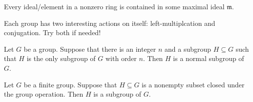 \documentclass[openany]{book}
\begin{document}
\begin{prop}
    Every ideal/element in a nonzero ring is contained in some maximal ideal $\mathfrak{m}$.
\end{prop}

\begin{prop}
    Each group has two interesting actions on itself: left-multiplcation and conjugation. Try both if needed!
\end{prop}

\begin{prop}
    Let $G$ be a group. Suppose that there is an integer $n$ and a subgroup $H\subseteq G$ such that $H$ is the only subgroup of $G$ with order $n$. Then $H$ is a normal subgroup of $G$.
\end{prop}

\begin{prop}
    Let $G$ be a finite group. Suppose that $H\subseteq G$ is a nonempty subset closed under the group operation. Then $H$ is a subgroup of $G$.
\end{prop}
\end{document}
